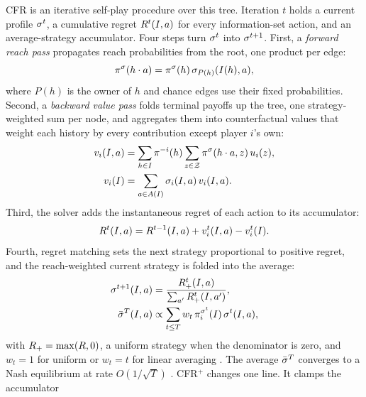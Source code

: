 CFR \cite{zinkevich2007regret} is an iterative self-play procedure over this tree.
Iteration $t$ holds a current profile $\sigma^t$, a cumulative regret $R^t(I,a)$
for every information-set action, and an average-strategy accumulator. Four steps
turn $\sigma^t$ into $\sigma^{t+1}$. First, a \emph{forward reach pass} propagates
reach probabilities from the root, one product per edge:
\begin{equation}
    \pi^{\sigma}(h\cdot a) = \pi^{\sigma}(h)\,\sigma_{P(h)}(I(h),a),
    \label{eq:reach}
\end{equation}
where $P(h)$ is the owner of $h$ and chance edges use their fixed probabilities.
Second, a \emph{backward value pass} folds terminal payoffs up the tree, one
strategy-weighted sum per node, and aggregates them into counterfactual values that
weight each history by every contribution except player $i$'s own:
\begin{equation}
\begin{aligned}
    v_i(I,a) &= \sum_{h\in I}\pi^{-i}(h)\sum_{z\in\mathcal{Z}}\pi^{\sigma}(h\cdot a, z)\,u_i(z),\\
    v_i(I) &= \sum_{a\in A(I)}\sigma_i(I,a)\,v_i(I,a).
\end{aligned}
    \label{eq:cfv}
\end{equation}
Third, the solver adds the instantaneous regret of each action to its accumulator:
\begin{equation}
    R^{t}(I,a) = R^{t-1}(I,a) + v_i^{t}(I,a) - v_i^{t}(I).
    \label{eq:regret}
\end{equation}
Fourth, regret matching \cite{hart2000simple} sets the next strategy proportional to
positive regret, and the reach-weighted current strategy is folded into the average:
\begin{equation}
\begin{aligned}
    \sigma^{t+1}(I,a) &= \frac{R^{t}_{+}(I,a)}{\sum_{a'}R^{t}_{+}(I,a')},\\
    \bar{\sigma}^{T}(I,a) &\propto \sum_{t\le T} w_t\,\pi_i^{\sigma^t}(I)\,\sigma^t(I,a),
\end{aligned}
    \label{eq:rm}
\end{equation}
with $R_{+}=\max(R,0)$, a uniform strategy when the denominator is zero,
and $w_t=1$ for uniform or $w_t=t$ for linear averaging \cite{tammelin2014solving}.
The average $\bar{\sigma}^{T}$ converges to a Nash equilibrium at rate
$O(1/\sqrt{T})$ \cite{zinkevich2007regret}. CFR$^{+}$ \cite{tammelin2014solving} changes one line. It clamps the accumulator
